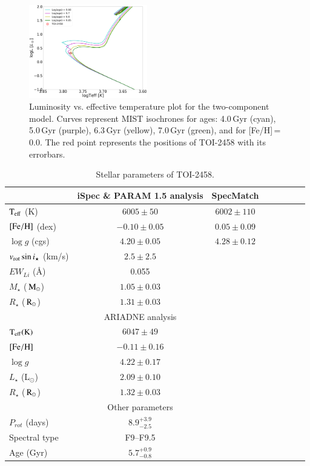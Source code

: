 \documentclass[traditabstract,longauth]{aa}
\providecommand{\mst}{\ensuremath{\,{\rm M_\odot}}}
\providecommand{\rst}{\ensuremath{\,{\rm R_\odot}}}
\begin{document}
\begin{figure}
\centering
\includegraphics[width=0.46\textwidth, trim= {0.0cm 0.0cm 0.0cm 0.0cm}]{figures/isochrones.png}
\caption{Luminosity vs. effective temperature plot for the two-component model. Curves represent MIST isochrones for ages: 4.0\,Gyr (cyan), 5.0\,Gyr (purple), 6.3\,Gyr (yellow), 7.0\,Gyr (green), and for [Fe/H]\,=\,0.0. The red point represents the positions of TOI-2458 with its errorbars.} \label{fig:isochrones}
\end{figure}

\begin{table}
 \centering
 \caption[]{Stellar parameters of TOI-2458.
 }
 \label{table:stellar_par}
\begin{adjustbox}{width=0.4\textwidth} 

	\begin{tabular}{lccccccr} %
		\hline
		\hline
& iSpec \& PARAM 1.5 analysis & SpecMatch \\
\hline
$\rm T_{eff}$ (K) & $6005 \pm 50$ & $6002 \pm 110$ \\
$[{\rm Fe/H}]$ (dex) & $-0.10 \pm 0.05$ & $0.05 \pm 0.09$ \\
$\log{g}$ (cgs) & $4.20 \pm 0.05$ & $4.28 \pm 0.12$ \\
$v_{\rm rot} \sin{i_\star} $ (km/s) & $2.5 \pm 2.5$ \\
$EW_{Li}$ (\AA) & 0.055 & \\
$M_\star$ ($\rm \mst$) & $1.05 \pm 0.03$ \\
$R_\star$ ($\rm \rst$) & $1.31 \pm 0.03$ \\
\hline
& ARIADNE analysis & \\
\hline
$\rm T_{eff} (K)$ & $6047 \pm 49$ \\
$[{\rm Fe/H}]$ & $-0.11 \pm 0.16$ \\
$\log{g}$ & $4.22 \pm 0.17$ \\
$L_\star$ (L$_{\odot}$) & $2.09 \pm 0.10$ \\
$R_\star$ ($\rm \rst$) & $1.32 \pm 0.03$ \\
\hline
& Other parameters & \\
\hline
$P_{rot}$ (days) & $8.9_{-2.5}^{+3.9} $ \\
Spectral type & F9--F9.5 \\
Age (Gyr) & $5.7_{-0.8}^{+0.9}$ \\
\hline
\hline
	\end{tabular}
\end{adjustbox}
\smallskip\\
\end{table}
\end{document}
